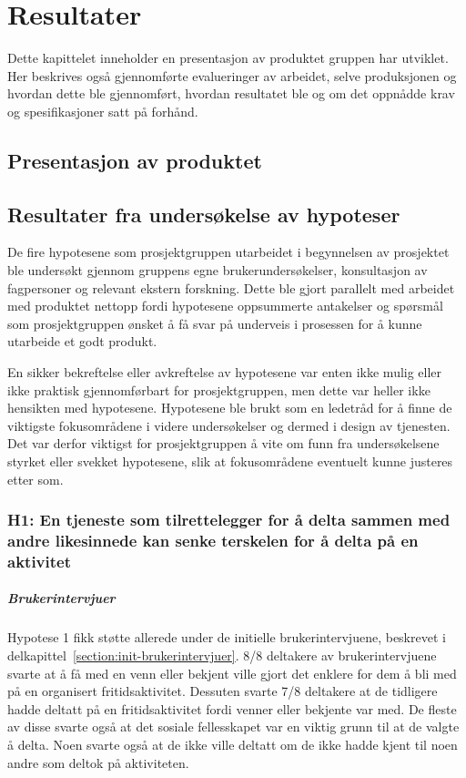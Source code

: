 \cleardoublepage
\chapter{Resultater}
\label{chap:results} 

Dette kapittelet inneholder en presentasjon av produktet gruppen har utviklet. Her beskrives også gjennomførte evalueringer av arbeidet, selve produksjonen og hvordan dette ble gjennomført, hvordan resultatet ble og om det oppnådde krav og spesifikasjoner satt på forhånd.

\section{Presentasjon av produktet}

\section{Resultater fra undersøkelse av hypoteser}

De fire hypotesene som prosjektgruppen utarbeidet i begynnelsen av prosjektet ble undersøkt gjennom gruppens egne brukerundersøkelser, konsultasjon av fagpersoner og relevant ekstern forskning. Dette ble gjort parallelt med arbeidet med produktet nettopp fordi hypotesene oppsummerte antakelser og spørsmål som prosjektgruppen ønsket å få svar på underveis i prosessen for å kunne utarbeide et godt produkt.

En sikker bekreftelse eller avkreftelse av hypotesene var enten ikke mulig eller ikke praktisk gjennomførbart for prosjektgruppen, men dette var heller ikke hensikten med hypotesene. Hypotesene ble brukt som en ledetråd for å finne de viktigste fokusområdene i videre undersøkelser og dermed i design av tjenesten. Det var derfor viktigst for prosjektgruppen å vite om funn fra undersøkelsene styrket eller svekket hypotesene, slik at fokusområdene eventuelt kunne justeres etter som.

\subsection{H1: En tjeneste som tilrettelegger for å delta sammen med andre likesinnede kan senke terskelen for å delta på en aktivitet}

\paragraph{Brukerintervjuer}
Hypotese 1 fikk støtte allerede under de initielle brukerintervjuene, beskrevet i delkapittel~\ref{section:init-brukerintervjuer}. 8/8 deltakere av brukerintervjuene svarte at å få med en venn eller bekjent ville gjort det enklere for dem å bli med på en organisert fritidsaktivitet. Dessuten svarte 7/8 deltakere at de tidligere hadde deltatt på en fritidsaktivitet fordi venner eller bekjente var med. De fleste av disse svarte også at det sosiale fellesskapet var en viktig grunn til at de valgte å delta. Noen svarte også at de ikke ville deltatt om de ikke hadde kjent til noen andre som deltok på aktiviteten.

